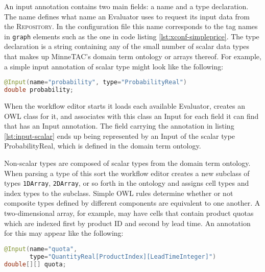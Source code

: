 \documentclass{article}
\begin{document}
An input annotation contains two main fields:  a name and a type declaration.
The name defines what name an Evaluator uses to request its input data from the \textsc{Repository}.
In the configuration file this name corresponds to the tag names in \texttt{graph} elements such as the one in code listing \ref{lst:xconf-simpleprice}.
The type declaration is a string containing any of the small number of scalar data types that makes up MinneTAC's domain term ontology or arrays thereof.
For example, a simple input annotation of scalar type might look like the following:

{\small
\begin{lstlisting}[language={Java},frame={single},label={lst:input-scalar},caption={An Input annotation with scalar type}]
@Input(name="probability", type="ProbabilityReal")
double probability;
\end{lstlisting}
}

When the workflow editor starts it loads each available Evaluator, creates an OWL class for it, and associates with this class an Input for each field it can find that has an Input annotation.
The field carrying the annotation in listing \ref{lst:input-scalar} ends up being represented by an Input of the scalar type ProbabilityReal, which is defined in the domain term ontology.

Non-scalar types are composed of scalar types from the domain term ontology.
When parsing a type of this sort the workflow editor creates a new subclass of types \texttt{1DArray}, \texttt{2DArray}, or so forth in the ontology and assigns cell types and index types to the subclass.
Simple OWL rules determine whether or not composite types defined by different components are equivalent to one another.
A two-dimensional array, for example, may have cells that contain product quotas which are indexed first by product ID and second by lead time.
An annotation for this may appear like the following:

{\small
\begin{lstlisting}[language={Java},frame={single},label={lst:input-composite},caption={An Input annotation with composite type}]
@Input(name="quota",
       type="QuantityReal[ProductIndex][LeadTimeInteger]")
double[][] quota;
\end{lstlisting}
}
\end{document}
